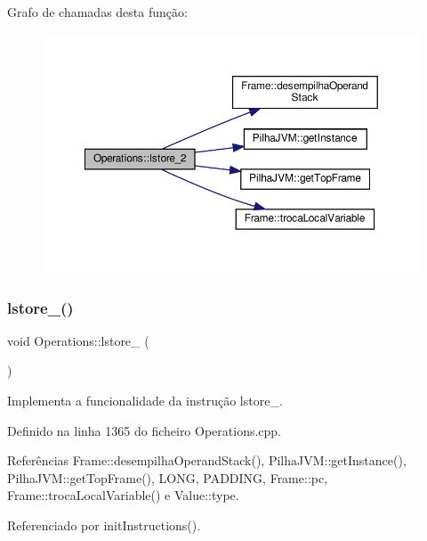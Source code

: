 Grafo de chamadas desta função\+:
\nopagebreak
\begin{figure}[H]
\begin{center}
\leavevmode
\includegraphics[width=350pt]{classOperations_a178660c2b3ca2625c140daf867531386_cgraph}
\end{center}
\end{figure}
\mbox{\label{classOperations_a00d5ca7ea5a68e9cccfdc26b11a716bf}} 
\subsubsection{\texorpdfstring{lstore\+\_()}{lstore\_3()}}
{\footnotesize\ttfamily void Operations\+::lstore\+\_ (\begin{DoxyParamCaption}{ }\end{DoxyParamCaption})\hspace{0.3cm}{\ttfamily [private]}}



Implementa a funcionalidade da instrução lstore\+\_. 



Definido na linha 1365 do ficheiro Operations.\+cpp.



Referências Frame\+::desempilha\+Operand\+Stack(), Pilha\+J\+V\+M\+::get\+Instance(), Pilha\+J\+V\+M\+::get\+Top\+Frame(), L\+O\+NG, P\+A\+D\+D\+I\+NG, Frame\+::pc, Frame\+::troca\+Local\+Variable() e Value\+::type.



Referenciado por init\+Instructions().

